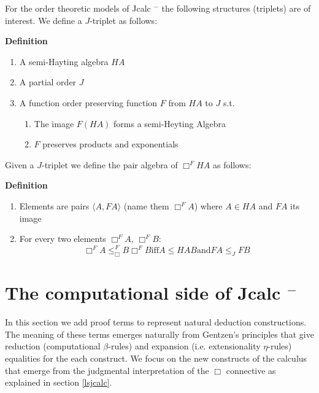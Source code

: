 			For the order theoretic models of  Jcalc $^{-}$ the following structures (triplets) 
			are of interest. We define a $J$-triplet as follows:
			\begin{mdframed}
				\textbf{Definition}
				
			\begin{enumerate}
			\item A semi-Hayting algebra $HA$
			\item A partial order $J$
			\item A function order preserving function $F$ from $HA$ to $J$ s.t.
			\begin{enumerate}
				\item The image $F(HA)$ forms a semi-Heyting Algebra
				\item $F$ preserves products and exponentials
			\end{enumerate}
			\end{enumerate}
		\end{mdframed}

			Given a $J$-triplet we define the pair algebra of $\Box^{F}HA$ as follows:
			\begin{mdframed}
				\textbf{Definition}
				
			\begin{enumerate}
				\item Elements are pairs $\langle A, FA\rangle$ (name them $\Box^{F}A$) where $A\in HA$ and $FA$ its image
				\item For every two elements  $\Box^{F}A$, $\Box^{F}B$:
				$$\Box^{F}A \le_\Box^{F}B \Box^{F}B \text{iff} A\le{HA}B \text{and} FA\le_J FB $$ 
			\end{enumerate}
		\end{mdframed}



\chapter{The computational side of Jcalc $^{-}$}
			In this section we add proof terms to represent natural deduction constructions. The  meaning of these terms emerges naturally from Gentzen's principles that give reduction (computational $\beta$-rules) and expansion (i.e. extensionality $\eta$-rules) equalities for the each construct. We focus on the new constructs of the calculus that emerge from the judgmental interpretation of the $\Box$ connective as explained in 
			section \ref{lsjcalc}.
			
